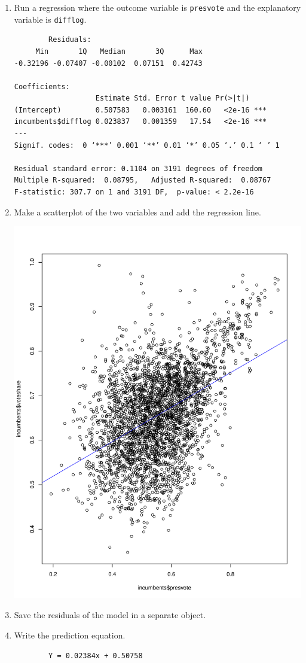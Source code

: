 \documentclass[12pt,letterpaper]{article}
\begin{document}
	\begin{enumerate}
		\item Run a regression where the outcome variable is \texttt{presvote} and the explanatory variable is \texttt{difflog}.
		 
		\begin{verbatim}
		Residuals:
     Min       1Q   Median       3Q      Max 
-0.32196 -0.07407 -0.00102  0.07151  0.42743 

Coefficients:
                   Estimate Std. Error t value Pr(>|t|)    
(Intercept)        0.507583   0.003161  160.60   <2e-16 ***
incumbents$difflog 0.023837   0.001359   17.54   <2e-16 ***
---
Signif. codes:  0 ‘***’ 0.001 ‘**’ 0.01 ‘*’ 0.05 ‘.’ 0.1 ‘ ’ 1

Residual standard error: 0.1104 on 3191 degrees of freedom
Multiple R-squared:  0.08795,	Adjusted R-squared:  0.08767 
F-statistic: 307.7 on 1 and 3191 DF,  p-value: < 2.2e-16
		\end{verbatim}
		
		
		\item Make a scatterplot of the two variables and add the regression line. 
		 
		\includegraphics[width=.75\textwidth]{plot_2.pdf} 
		
		\item Save the residuals of the model in a separate object.	
		
		
		\item Write the prediction equation.
		\begin{verbatim}
		Y = 0.02384x + 0.50758
		\end{verbatim}
		
	\end{enumerate}
	
\end{document}
